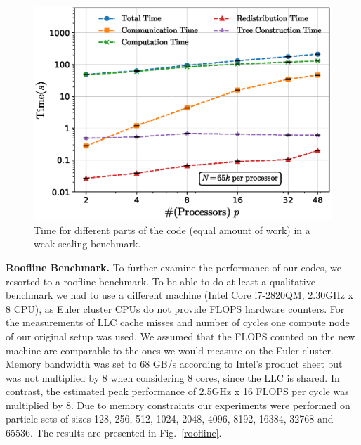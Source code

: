 \documentclass[letterpaper]{article}
\newcommand{\mypar}[1]{{\bf #1.}}
\begin{document}
\begin{figure}[h]
 \centering
 \includegraphics[scale=0.4]{figs/weak.eps}
  \caption{Time for different parts of the code (equal amount of work) in a weak scaling benchmark.\label{weaksc}}
\end{figure}


\mypar{Roofline Benchmark}
To further examine the performance of our codes, we resorted to a roofline benchmark. To be able to do at least a qualitative benchmark we had to use a different machine (Intel Core i7-2820QM, 2.30GHz x 8 CPU), as Euler cluster CPUs do not provide FLOPS hardware counters. For the measurements of LLC cache misses and number of cycles one compute node of our original setup was used. We assumed that the FLOPS counted on the new machine are comparable to the ones we would measure on the Euler cluster. Memory bandwidth was set to 68 GB/s according to Intel's product sheet but was not multiplied by 8 when considering 8 cores, since the LLC is shared. In contrast, the estimated peak performance of 2.5GHz x 16 FLOPS per cycle was multiplied by 8. Due to memory constraints our experiments were performed on particle sets of sizes 128, 256, 512, 1024, 2048, 4096, 8192, 16384, 32768 and 65536. The results are presented in Fig.~\ref{roofline}.
\end{document}
